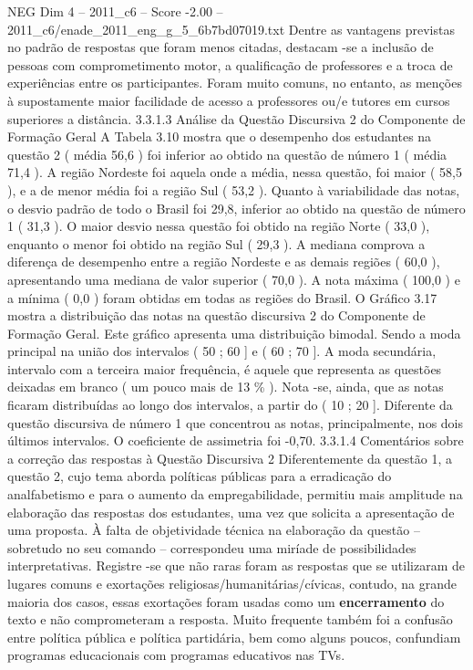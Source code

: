 \begin{textsample}{NEG Dim 4 – 2011\_c6 – Score -2.00 – 2011\_c6/enade\_2011\_eng\_g\_5\_6b7bd07019.txt}
Dentre as vantagens previstas no padrão de respostas que foram menos citadas, destacam -se a inclusão de pessoas com comprometimento motor, a qualificação de professores e a troca de experiências entre os participantes.
Foram muito comuns, no entanto, as menções à supostamente maior facilidade de acesso a professores ou/e tutores em cursos superiores a distância. 3.3.1.3 Análise da Questão Discursiva 2 do Componente de Formação Geral A Tabela 3.10 mostra que o desempenho dos estudantes na questão 2 ( média 56,6 ) foi inferior ao obtido na questão de número 1 ( média 71,4 ).
A região Nordeste foi aquela onde a média, nessa questão, foi maior ( 58,5 ), e a de menor média foi a região Sul ( 53,2 ).
Quanto à variabilidade das notas, o desvio padrão de todo o Brasil foi 29,8, inferior ao obtido na questão de número 1 ( 31,3 ).
O maior desvio nessa questão foi obtido na região Norte ( 33,0 ), enquanto o menor foi obtido na região Sul ( 29,3 ).
A mediana comprova a diferença de desempenho entre a região Nordeste e as demais regiões ( 60,0 ), apresentando uma mediana de valor superior ( 70,0 ).
A nota máxima ( 100,0 ) e a mínima ( 0,0 ) foram obtidas em todas as regiões do Brasil.
O Gráfico 3.17 mostra a distribuição das notas na questão discursiva 2 do Componente de Formação Geral.
Este gráfico apresenta uma distribuição bimodal.
Sendo a moda principal na união dos intervalos ( 50 ; 60 ] e ( 60 ; 70 ].
A moda secundária, intervalo com a terceira maior frequência, é aquele que representa as questões deixadas em branco ( um pouco mais de 13 \% ).
Nota -se, ainda, que as notas ficaram distribuídas ao longo dos intervalos, a partir do ( 10 ; 20 ].
Diferente da questão discursiva de número 1 que concentrou as notas, principalmente, nos dois últimos intervalos.
O coeficiente de assimetria foi -0,70. 3.3.1.4 Comentários sobre a correção das respostas à Questão Discursiva 2 Diferentemente da questão 1, a questão 2, cujo tema aborda políticas públicas para a erradicação do analfabetismo e para o aumento da empregabilidade, permitiu mais amplitude na elaboração das respostas dos estudantes, uma vez que solicita a apresentação de uma proposta.
À falta de objetividade técnica na elaboração da questão – sobretudo no seu comando – correspondeu uma miríade de possibilidades interpretativas.
Registre -se que não raras foram as respostas que se utilizaram de lugares comuns e exortações religiosas/humanitárias/cívicas, contudo, na grande maioria dos casos, essas exortações foram usadas como um \textbf{encerramento} do texto e não comprometeram a resposta.
Muito frequente também foi a confusão entre política pública e política partidária, bem como alguns poucos, confundiam programas educacionais com programas educativos nas TVs.

\end{textsample}
